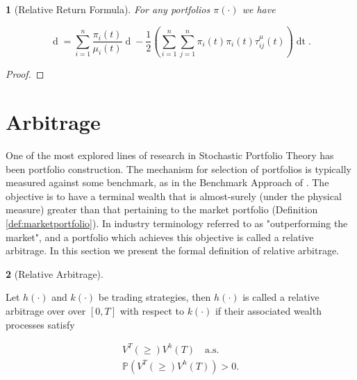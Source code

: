 \documentclass[british]{amsart}
\numberwithin{equation}{section}
\numberwithin{figure}{section}
\theoremstyle{plain}
\newtheorem{thm}{\protect\theoremname}[section]
\theoremstyle{definition}
\newtheorem{defn}[thm]{\protect\definitionname}
\theoremstyle{plain}
\theoremstyle{plain}
\theoremstyle{plain}
\theoremstyle{remark}
\theoremstyle{plain}
\providecommand{\definitionname}{Definition}
\providecommand{\theoremname}{Theorem}
\renewcommand{\d}[1]{\mathop{\mathrm{d}{#1}}}
\newcommand{\almostsurely}{\text{a.s.}}
\newcommand{\measure}{\mathbb{P}}
\newcommand{\valueprocess}[2]{V^{#1}(#2)}
\begin{document}
\begin{thm} [Relative Return Formula] For any portfolios $\pi(\cdot)$ we have

  \begin{equation*} \d{ \log{ \left( \frac{ V^{\pi}(t) }{ V^{\mu}(t) } \right) }
} = \sum_{i=1}^{n} \frac{\pi_{i}(t)}{\mu_{i}(t)} \d{\mu_{i}(t)} - \frac{1}{2}
\left( \sum_{i=1}^{n} \sum_{j=1}^{n} \pi_{i}(t) \pi_{i}(t) \tau_{ij}^{\mu}(t)
\right) \d{t}. \end{equation*} \end{thm}

\begin{proof} \end{proof}

\newpage

\section{Arbitrage}

One of the most explored lines of research in Stochastic Portfolio Theory has
been portfolio construction. The mechanism for selection of portfolios is
typically measured against some benchmark, as in the Benchmark Approach of
\cite{platen2006}. The objective is to have a terminal wealth that is
almost-surely (under the physical measure) greater than that pertaining to the
market portfolio (Definition \ref{def:marketportfolio}). In industry terminology
referred to as "outperforming the market", and a portfolio which achieves this
objective is called a relative arbitrage. In this section we present the formal
definition of relative arbitrage.



\begin{defn} [Relative Arbitrage] \label{def:relativearbitrage}

  Let $h(\cdot)$ and $k(\cdot)$ be trading strategies, then $h(\cdot)$ is called
a relative arbitrage over over $[0,T]$ with respect to $k(\cdot)$ if their
associated wealth processes satisfy

  \begin{gather*} \valueprocess{T} \ge \valueprocess{h}{T} \quad \almostsurely
\\ \measure(\valueprocess{T} \ge \valueprocess{h}{T}) > 0. \end{gather*}

\end{defn}
\end{document}
